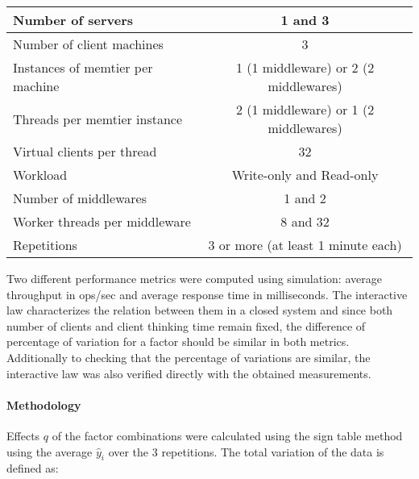 \documentclass[report.tex]{subfiles}
\begin{document}
\begin{center}
	\scriptsize{
		\begin{tabular}{|l|c|}
			\hline Number of servers                & 1 and 3                                     \\ 
			\hline Number of client machines        & 3                                           \\ 
			\hline Instances of memtier per machine & 1 (1 middleware) or 2 (2 middlewares) \\ 
			\hline Threads per memtier instance     & 2 (1 middleware) or 1 (2 middlewares)   \\
			\hline Virtual clients per thread       &  32                                     \\ 
			\hline Workload                         & Write-only and Read-only\\
			\hline Number of middlewares            & 1 and 2                                     \\
			\hline Worker threads per middleware    & 8 and 32                                    \\
			\hline Repetitions                      & 3 or more (at least 1 minute each)                                   \\ 
			\hline 
		\end{tabular}
	} 
\end{center}


Two different performance metrics were computed using simulation: average throughput in ops/sec and average response time in milliseconds. The interactive law characterizes the relation between them in a closed system and since both number of clients and client thinking time remain fixed, the difference of percentage of variation for a factor should be similar in both metrics.
Additionally to checking that the percentage of variations are similar, the interactive law was also verified directly with the obtained measurements. 

\paragraph{Methodology}

Effects $q$ of the factor combinations were calculated using the sign table method using the average $\hat{y}_i$ over the 3 repetitions.
The total variation of the data is defined as: 
\end{document}
